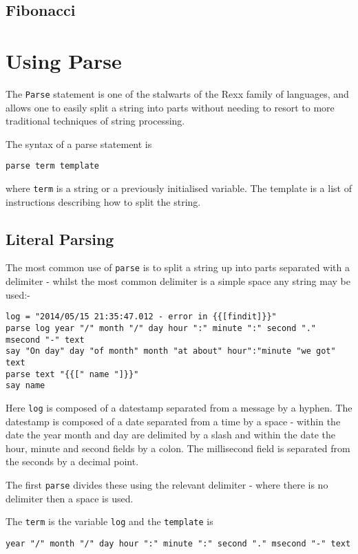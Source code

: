 \section{Fibonacci}

\chapter{Using Parse}
The \texttt{Parse} statement is one of the stalwarts of the Rexx
family of languages, and allows one to easily split a string into parts without needing to resort to more traditional techniques of string processing.

The syntax of a parse statement is 

\begin{verbatim}
parse term template 
\end{verbatim}
where \texttt{term} is a string or a previously initialised variable. The template is a list of instructions describing how to split the string.

\section{Literal Parsing}
The most common use of \texttt{parse} is to split a string up into parts separated with a delimiter - whilst the most common delimiter is a simple space any string may be used:-

\begin{lstlisting}[label=SimpleParseExample, caption=Simple Parse Example]
log = "2014/05/15 21:35:47.012 - error in {{[findit]}}"
parse log year "/" month "/" day hour ":" minute ":" second "." msecond "-" text
say "On day" day "of month" month "at about" hour":"minute "we got" text
parse text "{{[" name "]}}"
say name
\end{lstlisting}

Here \texttt{log}  is composed of a datestamp separated from a message by a hyphen. The datestamp is composed of a date separated from a time by a space - within the date the year month and day are delimited by a slash and within the date the hour, minute and second fields by a colon. The millisecond field is separated from the seconds by a decimal point.

The first \texttt{parse} divides these using the relevant delimiter - where there is no delimiter then a space is used.

The \texttt{term} is the variable \texttt{log} and the \texttt{template} is 
\begin{verbatim}
year "/" month "/" day hour ":" minute ":" second "." msecond "-" text
\end{verbatim}

